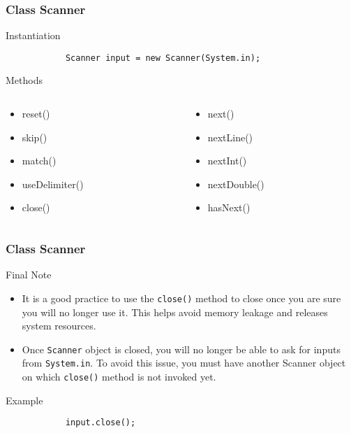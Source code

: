 \documentclass[10pt, compress]{beamer}
\begin{document}
\begin{frame}[fragile]
	\frametitle{Class Scanner}
	\begin{block}{Instantiation}
		\begin{verbatim}
			Scanner input = new Scanner(System.in);
		\end{verbatim}
	\end{block}
	\begin{block}{Methods}
		\begin{columns}
			\begin{column}{0.5\textwidth}
				\begin{itemize}
					\item[] reset()
					\item[] skip()
					\item[] match()
					\item[] useDelimiter()
					\item[] close()
				\end{itemize}
			\end{column}
			\begin{column}{0.5\textwidth}
				\begin{itemize}
					\item[] next()
					\item[] nextLine()
					\item[] nextInt()
					\item[] nextDouble()
					\item[] hasNext()
				\end{itemize}
			\end{column}
		\end{columns}
	\end{block}
\end{frame}

\begin{frame}[fragile]
	\frametitle{Class Scanner}
	\begin{block}{Final Note}
		\begin{itemize}
			\item[] It is a good practice to use the \texttt{close()} method to close once you are sure you will no longer use it. This helps avoid memory leakage and releases system resources.
			\item[] Once \texttt{Scanner} object is closed, you will no longer be able to ask for inputs from \texttt{System.in}. To avoid this issue, you must have another Scanner object on which \texttt{close()} method is not invoked yet.
		\end{itemize}
	\end{block}
	\begin{block}{Example}
		\begin{verbatim}
			input.close();
		\end{verbatim}
	\end{block}
\end{frame}
\end{document}
